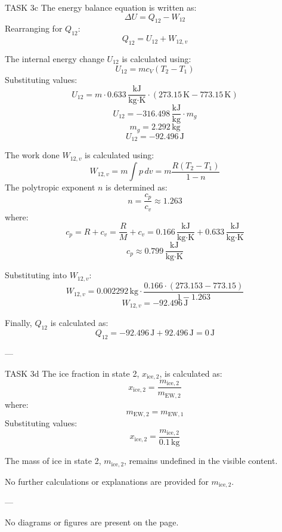 TASK 3c  
The energy balance equation is written as:  
\[
\Delta U = Q_{12} - W_{12}
\]  
Rearranging for \( Q_{12} \):  
\[
Q_{12} = U_{12} + W_{12,v}
\]  

The internal energy change \( U_{12} \) is calculated using:  
\[
U_{12} = m c_V (T_2 - T_1)
\]  
Substituting values:  
\[
U_{12} = m \cdot 0.633 \, \frac{\text{kJ}}{\text{kg·K}} \cdot (273.15 \, \text{K} - 773.15 \, \text{K})
\]  
\[
U_{12} = -316.498 \, \frac{\text{kJ}}{\text{kg}} \cdot m_g
\]  
\[
m_g = 2.292 \, \text{kg}
\]  
\[
U_{12} = -92.496 \, \text{J}
\]  

The work done \( W_{12,v} \) is calculated using:  
\[
W_{12,v} = m \int p \, dv = m \frac{R (T_2 - T_1)}{1 - n}
\]  
The polytropic exponent \( n \) is determined as:  
\[
n = \frac{c_p}{c_v} \approx 1.263
\]  
where:  
\[
c_p = R + c_v = \frac{R}{M} + c_v = 0.166 \, \frac{\text{kJ}}{\text{kg·K}} + 0.633 \, \frac{\text{kJ}}{\text{kg·K}}
\]  
\[
c_p \approx 0.799 \, \frac{\text{kJ}}{\text{kg·K}}
\]  

Substituting into \( W_{12,v} \):  
\[
W_{12,v} = 0.002292 \, \text{kg} \cdot \frac{0.166 \cdot (273.153 - 773.15)}{1 - 1.263}
\]  
\[
W_{12,v} = -92.496 \, \text{J}
\]  

Finally, \( Q_{12} \) is calculated as:  
\[
Q_{12} = -92.496 \, \text{J} + 92.496 \, \text{J} = 0 \, \text{J}
\]  

---

TASK 3d  
The ice fraction in state 2, \( x_{\text{ice},2} \), is calculated as:  
\[
x_{\text{ice},2} = \frac{m_{\text{ice},2}}{m_{\text{EW},2}}
\]  
where:  
\[
m_{\text{EW},2} = m_{\text{EW},1}
\]  
Substituting values:  
\[
x_{\text{ice},2} = \frac{m_{\text{ice},2}}{0.1 \, \text{kg}}
\]  

The mass of ice in state 2, \( m_{\text{ice},2} \), remains undefined in the visible content.  

No further calculations or explanations are provided for \( m_{\text{ice},2} \).  

---

No diagrams or figures are present on the page.
